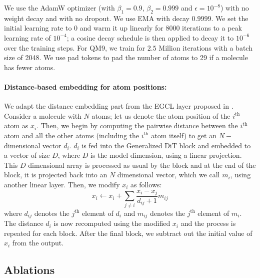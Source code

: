 We use the AdamW optimizer (with $\beta_1 = 0.9$, $\beta_2 = 0.999$ and $\epsilon = 10^{-8}$) with no weight decay and with no dropout.  We use EMA with decay $0.9999$.  We set the initial learning rate to 0 and warm it up linearly for 8000 iterations to a peak learning rate of $10^{-4}$; a cosine decay schedule is then applied to decay it to $10^{-6}$ over the training steps. For QM9, we train for $2.5$ Million iterations with a batch size of 2048. We use pad tokens to pad the number of atoms to 29 if a molecule has fewer atoms.

\paragraph{Distance-based embedding for atom positions:}
We adapt the distance embedding part from the EGCL layer proposed in \cite{hoogeboom2022equivariant}. Consider a molecule with $N$ atoms; let us denote the atom position of the $i^\text{th}$ atom as $x_i$. Then, we begin by computing the pairwise distance between the $i^\text{th}$ atom and all the other atoms (including the $i^\text{th}$ atom itself) to get an $N-$ dimensional vector $d_i$. $d_i$ is fed into the Generalized DiT block and embedded to a vector of size $D$, where $D$ is the model dimension, using a linear projection. This $D$ dimensional array is processed as usual by the block and at the end of the block, it is projected back into an $N$ dimensional vector, which we call $m_i$, using another linear layer. Then, we modify $x_i$ as follows:
$$ x_i  \leftarrow x_i + \sum_{j \neq i} \frac{x_i - x_j}{d_{ij} + 1} m_{ij} $$
where $d_{ij}$ denotes the $j^\text{th}$ element of $d_i$ and $m_{ij}$ denotes the $j^\text{th}$ element of $m_i$. The distance $d_i$ is now recomputed using the modified $x_i$ and the process is repeated for each block. After the final block, we subtract out the initial value of $x_i$ from the output. 

\subsection{Ablations}

